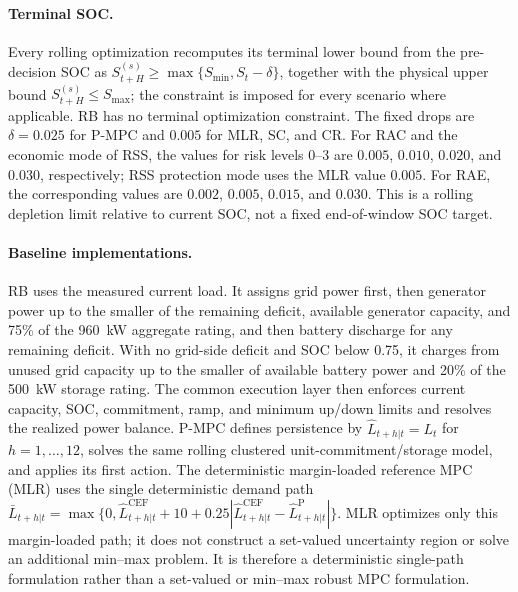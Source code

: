 \paragraph{Terminal SOC.}
Every rolling optimization recomputes its terminal lower bound from the
pre-decision SOC as
$S_{t+H}^{(s)}\geq\max\{S_{\min},S_t-\delta\}$, together with the physical
upper bound $S_{t+H}^{(s)}\leq S_{\max}$; the constraint is imposed for every
scenario where applicable. RB has no terminal optimization constraint.
The fixed drops are $\delta=0.025$ for P-MPC and $0.005$ for MLR, SC, and CR.
For RAC and the economic mode of RSS, the values for risk levels 0--3 are
$0.005$, $0.010$, $0.020$, and $0.030$, respectively; RSS protection mode uses
the MLR value $0.005$. For RAE, the corresponding values are $0.002$, $0.005$,
$0.015$, and $0.030$. This is a rolling depletion limit relative to current
SOC, not a fixed end-of-window SOC target.

\paragraph{Baseline implementations.}
RB uses the measured current load. It assigns grid power first, then generator
power up to the smaller of the remaining deficit, available generator
capacity, and 75\% of the 960~kW aggregate rating, and then battery discharge
for any remaining deficit. With no grid-side deficit and SOC below 0.75, it
charges from unused grid capacity up to the smaller of available battery power
and 20\% of the 500~kW storage rating. The common execution layer then enforces
current capacity, SOC, commitment, ramp, and minimum up/down limits and resolves
the realized power balance. P-MPC defines persistence by
$\hat L_{t+h|t}=L_t$ for $h=1,\ldots,12$, solves the same rolling clustered
unit-commitment/storage model, and applies its first action. The deterministic
margin-loaded reference MPC (MLR) uses the single deterministic demand path
$\bar L_{t+h|t}=\max\{0,\hat L^{\mathrm{CEF}}_{t+h|t}+10
+0.25|\hat L^{\mathrm{CEF}}_{t+h|t}-\hat L^{\mathrm{P}}_{t+h|t}|\}$.
MLR optimizes only this margin-loaded path; it does not construct a set-valued
uncertainty region or solve an additional min--max problem. It is therefore a
deterministic single-path formulation rather than a set-valued or min--max
robust MPC formulation.

